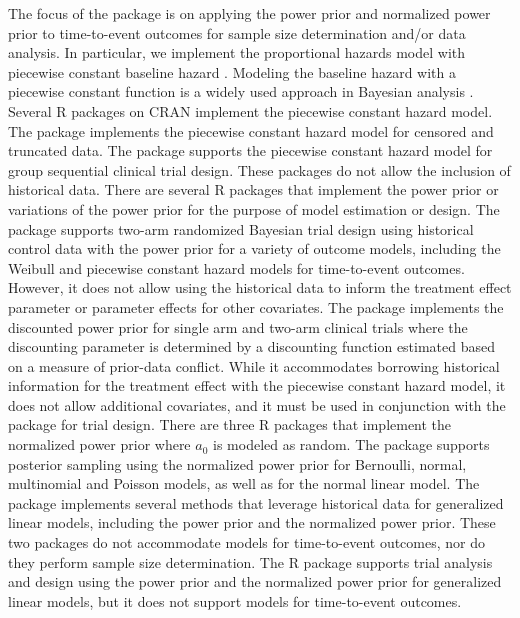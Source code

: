 The focus of the  package is on applying the power prior and normalized power prior to time-to-event outcomes for sample size determination and/or data analysis. In particular, we implement the proportional hazards model \citep{cox} with piecewise constant baseline hazard \citep{Friedman_1982}. Modeling the baseline hazard with a piecewise constant function is a widely used approach in Bayesian analysis \citep{ibrahim_2001}. Several R packages on CRAN implement the piecewise constant hazard model. The  package \citep{pch} implements the piecewise constant hazard model for censored and truncated data. The  package \citep{gsDesign} supports the piecewise constant hazard model for group sequential clinical trial design. These packages do not allow the inclusion of historical data. %
There are several R packages that implement the power prior or variations of the power prior for the purpose of model estimation or design. The  package \citep{bayesctdesign} supports two-arm randomized Bayesian trial design using historical control data with the power prior for a variety of outcome models, including the Weibull and piecewise constant hazard models for time-to-event outcomes. However, it does not allow using the historical data to inform the treatment effect parameter or parameter effects for other covariates. The  package \citep{bayesDP} implements the discounted power prior for single arm and two-arm clinical trials where the discounting parameter is determined by a discounting function estimated based on a measure of prior-data conflict. While it accommodates borrowing historical information for the treatment effect with the piecewise constant hazard model, it does not allow additional covariates, and it must be used in conjunction with the package  \citep{bayesCT} for trial design. There are three R packages that implement the normalized power prior where $a_0$ is modeled as random. The  package \citep{NPP} supports posterior sampling using the normalized power prior for Bernoulli, normal, multinomial and Poisson models, as well as for the normal linear model. The  \citep{hdbayes} package implements several methods that leverage historical data for generalized linear models, including the power prior and the normalized power prior. These two packages do not accommodate models for time-to-event outcomes, nor do they perform sample size determination. The R package  \citep{BayesPPD} supports trial analysis and design using the power prior and the normalized power prior for generalized linear models, but it does not support models for time-to-event outcomes. 

